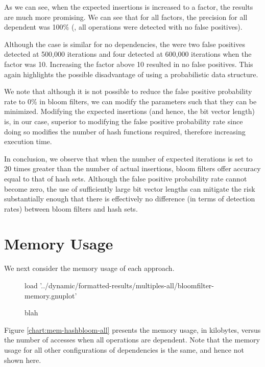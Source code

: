 As we can see, when the expected insertions is increased to a factor, the results are much more promising. We can see that for all factors, the precision for all dependent was 100\% (\ie, all operations were detected with no false positives).

Although the case is similar for no dependencies, the were two false positives detected at 500,000 iterations and four detected at 600,000 iterations when the factor was 10. Increasing the factor above 10 resulted in no false positives. This again highlights the possible disadvantage of using a probabilistic data structure.

We note that although it is not possible to reduce the false positive probability rate to 0\% in bloom filters, we can modify the parameters such that they can be minimized. Modifying the expected insertions (and hence, the bit vector length) is, in our case, superior to modifying the false positive probability rate since doing so modifies the number of hash functions required, therefore increasing execution time.

In conclusion, we observe that when the number of expected iterations is set to 20 times greater than the number of actual insertions, bloom filters offer accuracy equal to that of hash sets. Although the false positive probability rate cannot become zero, the use of sufficiently large bit vector lengths can mitigate the risk substantially enough that there is effectively no difference (in terms of detection rates) between bloom filters and hash sets.

\section{Memory Usage} \label{sec:results/memory}
We next consider the memory usage of each approach.

\begin{figure}
	\centering
	\begin{gnuplot}[terminal=pdf]
		load '../dynamic/formatted-results/multiples-all/bloomfilter-memory.gnuplot'
	\end{gnuplot}
	\caption{blah}
	\label{chart:mem-factors}
\end{figure}

Figure \ref{chart:mem-hashbloom-all} presents the memory usage, in kilobytes, versus the number of accesses when all operations are dependent. Note that the memory usage for all other configurations of dependencies is the same, and hence not shown here.

